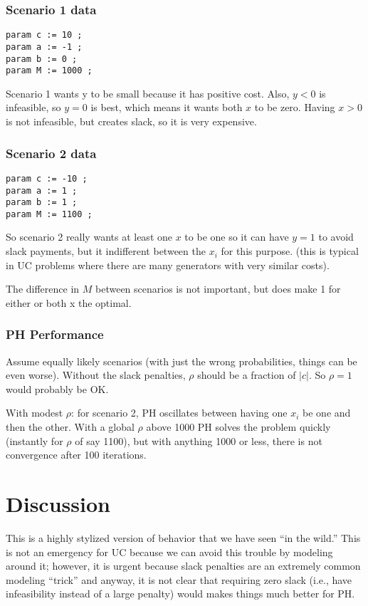 \documentclass[12pt]{article}
\begin{document}
\subsubsection{Scenario 1 data}
\begin{verbatim}
param c := 10 ;
param a := -1 ;
param b := 0 ;
param M := 1000 ;
\end{verbatim}
Scenario 1 wants y to be small because it has positive cost. Also, $y<0$ is infeasible, so
$y=0$ is best, which means it wants both $x$ to be zero. Having $x>0$ is not infeasible, but
creates slack, so it is very expensive.

\subsubsection{Scenario 2 data}

\begin{verbatim}
param c := -10 ;
param a := 1 ;
param b := 1 ;
param M := 1100 ;
\end{verbatim}
So scenario 2 really wants at least one $x$ to be one so it can have $y=1$ to avoid slack payments, but it indifferent between the $x_{i}$ for
this purpose. (this is typical in UC problems
where there are many generators with very similar costs).

The difference in $M$ between scenarios is not important, but does make 1 for either or both x the optimal.

\subsubsection{PH Performance}
Assume equally likely scenarios (with just the wrong probabilities, things can be even worse).
Without the slack penalties, $\rho$ should be a fraction of $|c|$. So $\rho=1$ would probably be OK.

With modest $\rho$: for scenario 2, PH oscillates between having one
$x_i$ be one and then the other. With a global $\rho$ above 1000 PH solves
the problem quickly (instantly for $\rho$ of say 1100), but with anything 1000 or less, there is not
convergence after 100 iterations.

\section{Discussion}

This is a highly stylized version of behavior that we have seen ``in
the wild.'' This is not an emergency for UC because we can avoid this
trouble by modeling around it; however, it is urgent because slack
penalties are an extremely common modeling ``trick'' and anyway, it is
not clear that requiring zero slack (i.e., have infeasibility instead
of a large penalty) would makes things much better for PH.
\end{document}
